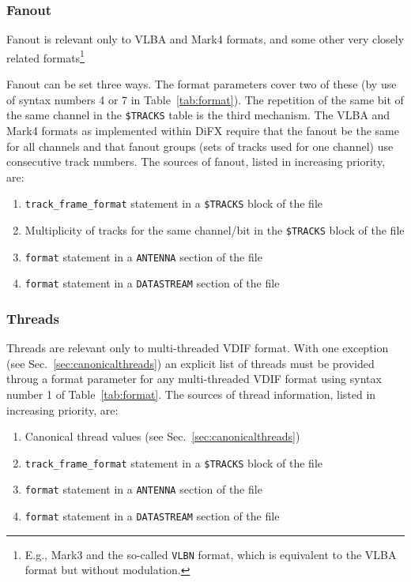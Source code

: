 \documentclass[12pt]{article}
\begin{document}
\subsubsection{Fanout}

Fanout is relevant only to VLBA and Mark4 formats, and some other very closely related formats\footnote{E.g., Mark3 and the so-called {\tt VLBN} format, which is equivalent to the VLBA format but without modulation.}

Fanout can be set three ways.
The format parameters cover two of these (by use of syntax numbers 4 or 7 in Table~\ref{tab:format}).
The repetition of the same bit of the same channel in the {\tt \$TRACKS} table is the third mechanism.
The VLBA and Mark4 formats as implemented within DiFX require that the fanout be the same for all channels and that fanout groups (sets of tracks used for one channel) use consecutive track numbers.
The sources of fanout, listed in increasing priority, are:
\begin{enumerate}
\item {\tt track\_frame\_format} statement in a {\tt \$TRACKS} block of the \vx file
\item Multiplicity of tracks for the same channel/bit in the {\tt \$TRACKS} block of the \vx file
\item {\tt format} statement in a {\tt ANTENNA} section of the \vd file
\item {\tt format} statement in a {\tt DATASTREAM} section of the \vd file
\end{enumerate}

\subsubsection{Threads}

Threads are relevant only to multi-threaded VDIF format.
With one exception (see Sec.~\ref{sec:canonicalthreads}) an explicit list of threads must be provided throug a format parameter for any multi-threaded VDIF format using syntax number 1 of Table~\ref{tab:format}.
The sources of thread information, listed in increasing priority, are:
\begin{enumerate}
\item Canonical thread values (see Sec.~\ref{sec:canonicalthreads})
\item {\tt track\_frame\_format} statement in a {\tt \$TRACKS} block of the \vx file
\item {\tt format} statement in a {\tt ANTENNA} section of the \vd file
\item {\tt format} statement in a {\tt DATASTREAM} section of the \vd file
\end{enumerate}
\end{document}
